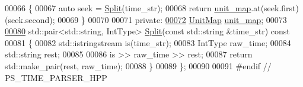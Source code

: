 \begin{DoxyCode}
00066 \textcolor{keyword}{    }\{
00067         \textcolor{keyword}{auto} seek = \hyperlink{classTimeParser_a3f7f36a669233d66e7fe1ca8405eefd5}{Split}(time\_str);
00068         \textcolor{keywordflow}{return} \hyperlink{classTimeParser_a98bb2b31f6ad5210139bc87ef7ad0121}{unit\_map}.at(seek.first)(seek.second);
00069     \}
00070 
00071 \textcolor{keyword}{private}:
\hypertarget{time__parser_8hpp_source_l00072}{}\hyperlink{classTimeParser_a98bb2b31f6ad5210139bc87ef7ad0121}{00072}     \hyperlink{classTimeParser_adc32afc638ace5060a2134f8f74d3c60}{UnitMap} \hyperlink{classTimeParser_a98bb2b31f6ad5210139bc87ef7ad0121}{unit\_map}; 
00073 
\hypertarget{time__parser_8hpp_source_l00080}{}\hyperlink{classTimeParser_a3f7f36a669233d66e7fe1ca8405eefd5}{00080}     std::pair<std::string, IntType> \hyperlink{classTimeParser_a3f7f36a669233d66e7fe1ca8405eefd5}{Split}(\textcolor{keyword}{const} std::string &time\_str)\textcolor{keyword}{ const}
00081 \textcolor{keyword}{    }\{
00082         std::istringstream is(time\_str);
00083         IntType raw\_time;
00084         std::string rest;
00085 
00086         is >> raw\_time >> rest;
00087         \textcolor{keywordflow}{return} std::make\_pair(rest, raw\_time);
00088     \}
00089 \};
00090 
00091 \textcolor{preprocessor}{#endif // PS\_TIME\_PARSER\_HPP}
\end{DoxyCode}
